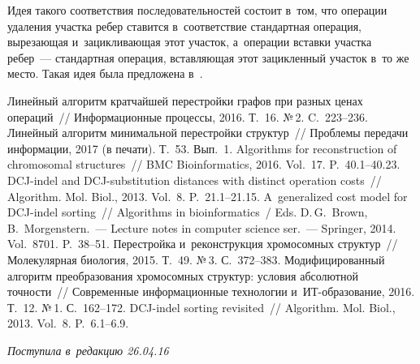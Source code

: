 \begin{multicols}{2}
  Идея такого соответствия последовательностей состоит в~том, что операции 
удаления участка ребер ставится в~соответствие стандартная операция, 
вырезающая и~зацикливающая этот участок, а~операции вставки участка 
ребер~--- стандартная операция, вставляющая этот зацикленный участок в~то же 
место. Такая идея была предложена в~\cite{8-gor}.
  
{\small\frenchspacing
 {%
 \begin{thebibliography}{9}
 Линейный алгоритм кратчайшей перестройки графов 
при разных ценах операций~// Информационные процессы, 2016. Т.~16. №\,2. C.~223--236.
 Линейный алгоритм минимальной перестройки 
структур~// Проблемы передачи информации, 2017  (в печати). Т.~53. Вып.~1.
 Algorithms for 
reconstruction of chromosomal structures~// BMC Bioinformatics, 2016. Vol.~17. P.~40.1--40.23.
 DCJ-indel and  
DCJ-substitution distances with distinct operation costs~// Algorithm. Mol. Biol., 2013. 
Vol.~8. P.~21.1--21.15.
 A~generalized cost model for DCJ-indel sorting~// 
Algorithms in bioinformatics~/ Eds. D.\,G.~Brown, B.~Morgenstern.~---
Lecture notes in 
computer science ser.~--- Springer, 2014. Vol.~8701. P.~38--51.
 Перестройка и~реконструкция 
хромосомных структур~// Молекулярная биология, 2015. Т.~49. №\,3. С.~372--383.
 Модифицированный алгоритм преобразования 
хромосомных структур: условия абсолютной точ\-ности~// Современные информационные 
технологии и~ИТ-обра\-зо\-ва\-ние, 2016. Т.~12. №\,1. С.~162--172.
 DCJ-indel sorting revisited~// Algorithm. Mol. Biol., 2013. 
Vol.~8. P.~6.1--6.9.
 \end{thebibliography}

 }
 }

\end{multicols}

\vspace*{-6pt}

\hfill{\small\textit{Поступила в~редакцию 26.04.16}}

\vspace*{6pt}

